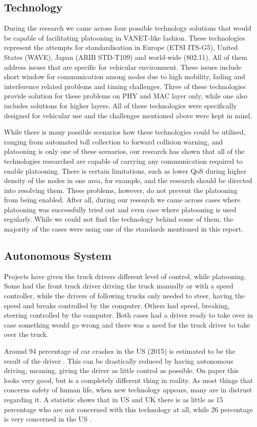 \subsection{Technology}
% 
During the research we came across four possible technology solutions that would be capable of facilitating platooning in VANET-like fashion. These technologies represent the attempts for standardisation in Europe (\acrshort{ETSI} ITS-G5), United States (WAVE), Japan (ARIB STD-T109) and world-wide (802.11). All of them address issues that are specific for vehicular environment. These issues include short window for communication among nodes due to high mobility, fading and interference related problems and timing challenges. Three of these technologies provide solution for these problems on PHY and MAC layer only, while one also includes solutions for higher layers. All of these technologies were specifically designed for vehicular use and the challenges mentioned above were kept in mind.\par
% 
While there is many possible scenarios how these technologies could be utilised, ranging from automated toll collection to forward collision warning, and platooning is only one of these scenarios, our research has shown that all of the technologies researched are capable of carrying any communication required to enable platooning. There is certain limitations, such as lower \acrshort{QoS} during higher density of the nodes in one area, for example, and the research should be directed into resolving them. These problems, however, do not prevent the platooning from being enabled. After all, during our research we came across cases where platooning was successfully tried out and even case where platooning is used regularly. While we could not find the technology behind some of them, the majority of the cases were using one of the standards mentioned in this report.\par
% 
%
\subsection{Autonomous System}
Projects have given the truck drivers different level of control, while platooning. Some had the front truck driver driving the truck manually or with a speed controller, while the drivers of following trucks only needed to steer, having the speed and breaks controlled by the computer. Others had speed, breaking, steering controlled by the computer. Both cases had a driver ready to take over in case something would go wrong and there was a need for the truck driver to take over the truck.\par
% 
Around 94 percentage of car crashes in the US (2015) is estimated to be the result of the driver \cite{HighwayTrafficSafetyAdministration2015TRAFFICSurvey}.
This can be drastically reduced by having autonomous driving, meaning, giving the driver as little control as possible. On paper this looks very good, but is a completely different thing in reality. As most things that concerns safety of human life, when new technology appears, many are in distrust regarding it. A statistic shows that in US and UK there is as little as 15 percentage who are not concerned with this technology at all, while 26 percentage is very concerned in the US \cite{Schoettle2014AAustralia}. 
